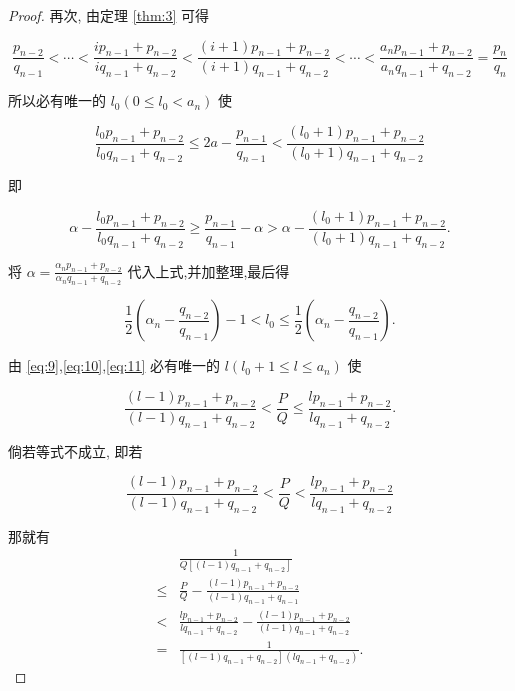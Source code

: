 \documentclass{ctexart}
\begin{document}
\begin{proof}
再次, 由定理 \ref{thm:3} 可得

\begin{equation}
\label{eq:10}
\frac{{p}_{n - 2}}{{q}_{n - 1}} < \cdots < \frac{i{p}_{n - 1} + {p}_{n - 2}}{i{q}_{n - 1} + {q}_{n - 2}} < \frac{\left( {i + 1}\right) {p}_{n - 1} + {p}_{n - 2}}{\left( {i + 1}\right) {q}_{n - 1} + {q}_{n - 2}} < \cdots < \frac{{a}_{n}{p}_{n - 1} + {p}_{n - 2}}{{a}_{n}{q}_{n - 1} + {q}_{n - 2}} = \frac{{p}_{n}}{{q}_{n}} 
\end{equation}

所以必有唯一的 \({l}_{0}\left( {0 \leq {l}_{0} < {a}_{n}}\right)\) 使

\begin{equation}
\label{eq:11}
\frac{{l}_{0}{p}_{n - 1} + {p}_{n - 2}}{{l}_{0}{q}_{n - 1} + {q}_{n - 2}} \leq {2a} - \frac{{p}_{n - 1}}{{q}_{n - 1}} < \frac{\left( {{l}_{0} + 1}\right) {p}_{n - 1} + {p}_{n - 2}}{\left( {{l}_{0} + 1}\right) {q}_{n - 1} + {q}_{n - 2}} 
\end{equation}

即

\[
\alpha - \frac{{l}_{0}{p}_{n - 1} + {p}_{n - 2}}{{l}_{0}{q}_{n - 1} + {q}_{n - 2}} \geq \frac{{p}_{n - 1}}{{q}_{n - 1}} - \alpha > \alpha - \frac{\left( {{l}_{0} + 1}\right) {p}_{n - 1} + {p}_{n - 2}}{\left( {{l}_{0} + 1}\right) {q}_{n - 1} + {q}_{n - 2}}.
\]

将 \(\alpha = \frac{{\alpha }_{n}{p}_{n - 1} + {p}_{n - 2}}{{\alpha }_{n}{q}_{n - 1} + {q}_{n - 2}}\) 代入上式,并加整理,最后得

\[
\frac{1}{2}\left( {{\alpha }_{n} - \frac{{q}_{n - 2}}{{q}_{n - 1}}}\right) - 1 < {l}_{0} \leq \frac{1}{2}\left( {{\alpha }_{n} - \frac{{q}_{n - 2}}{{q}_{n - 1}}}\right) .
\]

由 \eqref{eq:9},\eqref{eq:10},\eqref{eq:11} 必有唯一的 \(l\left( {{l}_{0} + 1 \leq l \leq {a}_{n}}\right)\) 使

\[
\frac{\left( {l - 1}\right) {p}_{n - 1} + {p}_{n - 2}}{\left( {l - 1}\right) {q}_{n - 1} + {q}_{n - 2}} < \frac{P}{Q} \leq \frac{l{p}_{n - 1} + {p}_{n - 2}}{l{q}_{n - 1} + {q}_{n - 2}}.
\]

倘若等式不成立, 即若

\[
\frac{\left( {l - 1}\right) {p}_{n - 1} + {p}_{n - 2}}{\left( {l - 1}\right) {q}_{n - 1} + {q}_{n - 2}} < \frac{P}{Q} < \frac{l{p}_{n - 1} + {p}_{n - 2}}{l{q}_{n - 1} + {q}_{n - 2}}
\]

那就有
\begin{align*}
  &\frac{1}{Q\left\lbrack {\left( {l - 1}\right) {q}_{n - 1} + {q}_{n - 2}}\right\rbrack } \\
  \leq & \frac{P}{Q} - \frac{\left( {l - 1}\right) {p}_{n - 1} + {p}_{n - 2}}{\left( {l - 1}\right) {q}_{n - 1} + {q}_{n - 1}}\\
  <& \frac{l{p}_{n - 1} + {p}_{n - 2}}{l{q}_{n - 1} + {q}_{n - 2}} - \frac{\left( {l - 1}\right) {p}_{n - 1} + {p}_{n - 2}}{\left( {l - 1}\right) {q}_{n - 1} + {q}_{n - 2}}\\
  =& \frac{1}{\left\lbrack {\left( {l - 1}\right) {q}_{n - 1} + {q}_{n - 2}}\right\rbrack \left( {l{q}_{n - 1} + {q}_{n - 2}}\right) }.
\end{align*}


\end{proof}
\end{document}
